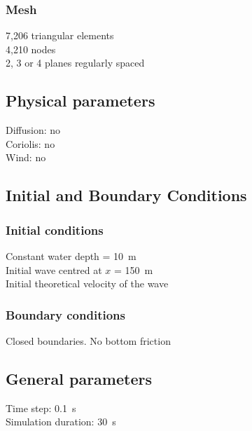\subsubsection{Mesh}
%
7,206 triangular elements\\
4,210 nodes\\
2, 3 or 4 planes regularly spaced
%
%
%
\subsection{Physical parameters}
%
Diffusion: no\\
Coriolis: no\\
Wind: no
%
%
%
%
%
%
\subsection{Initial and Boundary Conditions}
%
\subsubsection{Initial conditions}
%
Constant water depth = 10~m\\
Initial wave centred at $x$ = 150~m\\
Initial theoretical velocity of the wave
%
\subsubsection{Boundary conditions}
%
Closed boundaries. No bottom friction
%
\subsection{General parameters}
%
Time step: 0.1~s\\
Simulation duration: 30~s
%
%
%
